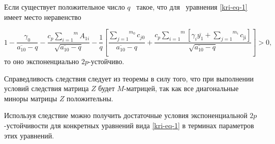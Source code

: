\begin{corollary}
Если существует положительное число  $q$ \ такое, что для \ уравнения \eqref{kri-eq-1} имеет место
неравенство

\begin{equation}\label{kri-eq-14}
	1-\frac{\gamma _0}{\overline{a_{10}}-q}-\frac{c_p\overset m{\underset{i=1}{\sum
		}}A_{1i}}{\sqrt{\overline{a_{10}}-q}}-\frac 1 q\left[\frac{\overset{m_0}{\underset{j=1}{\sum
		}}c_{\mathit{j0}}}{\overline{a_{10}}-q}+\frac{c_p\overset m{\underset{i=1}{\sum }}\left[\gamma
		_i\overline{y_1}+\overset{m_i}{\underset{j=1}{\sum
		}}c_{\text{ji}}\right]}{\sqrt{\overline{a_{10}}-q}}\right]>0,
\end{equation}
то оно экспоненциально  $2p${}-устойчиво.
\end{corollary}

Справедливость следствия следует из теоремы в силу того, что при выполнении условий следствия матрица  $Z$
будет  $M${}-матрицей, так как все диагональные миноры матрицы  $Z$
положительны.

Используя следствие можно получить достаточные условия экспоненциальной  $2p$-\linebreak устойчивости для конкретных уравнений
вида \eqref{kri-eq-1} в терминах параметров этих уравнений. 